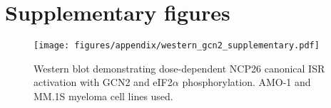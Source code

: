 \chapter{Supplementary figures}

\begin{figure}[ht]
\centering
\texttt{[image: figures/appendix/western\_gcn2\_supplementary.pdf]}
\caption[GCN2 and eIF2$\alpha$ western blot ]{Western blot demonstrating dose-dependent NCP26 canonical ISR activation with GCN2 and eIF2$\alpha$ phosphorylation. AMO-1 and MM.1S myeloma cell lines used.
}
\label{fig:sup_western}
\end{figure}
